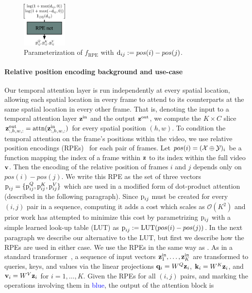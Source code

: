 \begin{figure}
  \begin{center}
    \includegraphics[width=0.2\textwidth]{figs/fdm/rpe-net.pdf}
  \end{center}
  \caption{Parameterization of $f_\text{RPE}$ with ${\textnormal{d}}_{ij} := pos(i)-pos(j)$.}
  \label{fig:fdm-rpe-net}
\end{figure}

\paragraph{Relative position encoding background and use-case} Our temporal attention layer is run independently at every spatial location, allowing each spatial location in every frame to attend to its counterparts at the same spatial location in every other frame. That is, denoting the input to a temporal attention layer ${\mathbf{z}}^\text{in}$ and the output ${\mathbf{z}}^\text{out}$, we compute the $K \times C$ slice ${\mathbf{z}}^\text{out}_{:,h,w,:} = \text{attn}({\mathbf{z}}^\text{in}_{:,h,w,:})$ for every spatial position $(h,w)$. To condition the temporal attention on the frame's positions within the video, we use relative position encodings (RPEs)~\citep{shaw2018self,wu2021rethinking} for each pair of frames. Let $pos(i) = (\mathcal{X}\oplus\mathcal{Y})_i$ be a function mapping the index of a frame within ${\mathbf{z}}$ to its index within the full video ${\mathbf{v}}$. Then the encoding of the relative position of frames $i$ and $j$ depends only on $pos(i)-pos(j)$. We write this RPE as the set of three vectors ${\textnormal{p}}_{ij} = \{{\textnormal{p}}_{ij}^Q, {\textnormal{p}}_{ij}^K, {\textnormal{p}}_{ij}^V\}$ which are used in a modified form of dot-product attention (described in the following paragraph). Since ${\textnormal{p}}_{ij}$ must be created for every $(i,j)$ pair in a sequence, computing it adds a cost which scales as $\mathcal{O}(K^2)$ and prior work has attempted to minimize this cost by parametrizing ${\textnormal{p}}_{ij}$ with a simple learned look-up table (LUT) as ${{\textnormal{p}}_{ij} := \text{LUT}(pos(i)-pos(j))}$. In the next paragraph we describe our alternative to the LUT, but first we describe how the RPEs are used in either case. We use the RPEs in the same way as \citet{shaw2018self}. As in a standard transformer~\citep{vaswani2017attention}, a sequence of input vectors ${\mathbf{z}}_1^\text{in},\ldots,{\mathbf{z}}_{K}^\text{in}$ are transformed to queries, keys, and values via the linear projections ${\mathbf{q}}_i = W^Q {\mathbf{z}}_i$, ${\mathbf{k}}_i = W^K {\mathbf{z}}_i$, and ${\mathbf{v}}_i = W^V {\mathbf{z}}_i$ for $i=1,\ldots,K$. Given the RPEs for all $(i,j)$ pairs, and marking the operations involving them in \textcolor{blue}{blue}, the output of the attention block is
